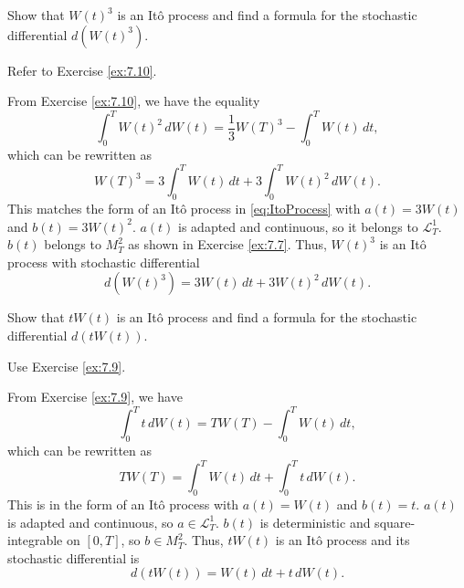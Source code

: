 \begin{Exercise}
\label{ex:7.12}
Show that $W(t)^3$ is an Itô process and find a formula for the stochastic differential $d(W(t)^3)$.

\begin{hint}
Refer to Exercise \ref{ex:7.10}.
\end{hint}
\end{Exercise}

\begin{Solution}
From Exercise \ref{ex:7.10}, we have the equality
\begin{equation*}
\int_0^T W(t)^2 \, dW(t) = \frac{1}{3} W(T)^3 - \int_0^T W(t) \, dt,
\end{equation*}
which can be rewritten as
\begin{equation*}
W(T)^3 = 3 \int_0^T W(t) \, dt + 3 \int_0^T W(t)^2 \, dW(t).
\end{equation*}
This matches the form of an Itô process in \eqref{eq:ItoProcess} with $a(t) = 3W(t)$ and $b(t) = 3W(t)^2$. $a(t)$ is adapted and continuous, so it belongs to $\mathcal{L}_T^1$. $b(t)$ belongs to $M_T^2$ as shown in Exercise \ref{ex:7.7}. Thus, $W(t)^3$ is an Itô process with stochastic differential
\begin{equation*}
d(W(t)^3) = 3W(t) \, dt + 3W(t)^2 \, dW(t).
\end{equation*}
\end{Solution}

\begin{Exercise}
\label{ex:7.13}
Show that $tW(t)$ is an Itô process and find a formula for the stochastic differential $d(tW(t))$.

\begin{hint}
Use Exercise \ref{ex:7.9}.
\end{hint}
\end{Exercise}

\begin{Solution}
From Exercise \ref{ex:7.9}, we have
\begin{equation*}
\int_0^T t \, dW(t) = T W(T) - \int_0^T W(t) \, dt,
\end{equation*}
which can be rewritten as
\begin{equation*}
T W(T) = \int_0^T W(t) \, dt + \int_0^T t \, dW(t).
\end{equation*}
This is in the form of an Itô process with $a(t) = W(t)$ and $b(t) = t$. $a(t)$ is adapted and continuous, so $a \in \mathcal{L}_T^1$. $b(t)$ is deterministic and square-integrable on $[0, T]$, so $b \in M_T^2$. Thus, $tW(t)$ is an Itô process and its stochastic differential is
\begin{equation*}
d(tW(t)) = W(t) \, dt + t \, dW(t).
\end{equation*}
\end{Solution}

